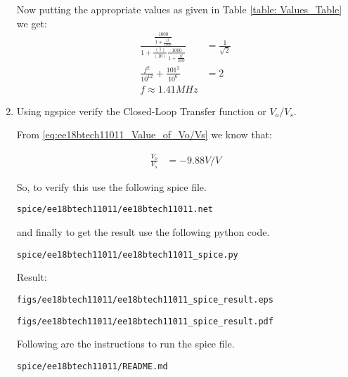 \begin{enumerate}[label=\arabic*.,ref=\theenumi]
Now putting the appropriate values as given in Table \ref{table: Values_Table} we get:
\begin{align}
     \frac{\frac{1000}{1 + \frac{jf}{1000}}}{1 + \frac{(1)}{(10)}\frac{1000}{1 + \frac{jf}{1000}}} &= \frac{1}{\sqrt{2}}
\\
     \frac{f^2}{10^{1 2}} + \frac{101^2}{10^6} &= 2
\\
     f \approx 1.41MHz
\end{align}
\item Using ngspice verify the Closed-Loop Transfer function or $V_{o}/V_{s}$.

\solution From \ref{eq:ee18btech11011_Value_of_Vo/Vs} we know that:

\begin{align}
    \frac{V_{o}}{V_{s}} &= -9.88V/V
\end{align}

So, to verify this use the following spice file.

\begin{lstlisting}
spice/ee18btech11011/ee18btech11011.net
\end{lstlisting}

and finally to get the result use the following python code.

\begin{lstlisting}
spice/ee18btech11011/ee18btech11011_spice.py
\end{lstlisting}

Result:
\begin{lstlisting}
figs/ee18btech11011/ee18btech11011_spice_result.eps
\end{lstlisting}
\begin{lstlisting}
figs/ee18btech11011/ee18btech11011_spice_result.pdf
\end{lstlisting}

Following are the instructions to run the spice file.
\begin{lstlisting}
spice/ee18btech11011/README.md
\end{lstlisting}


\end{enumerate}
